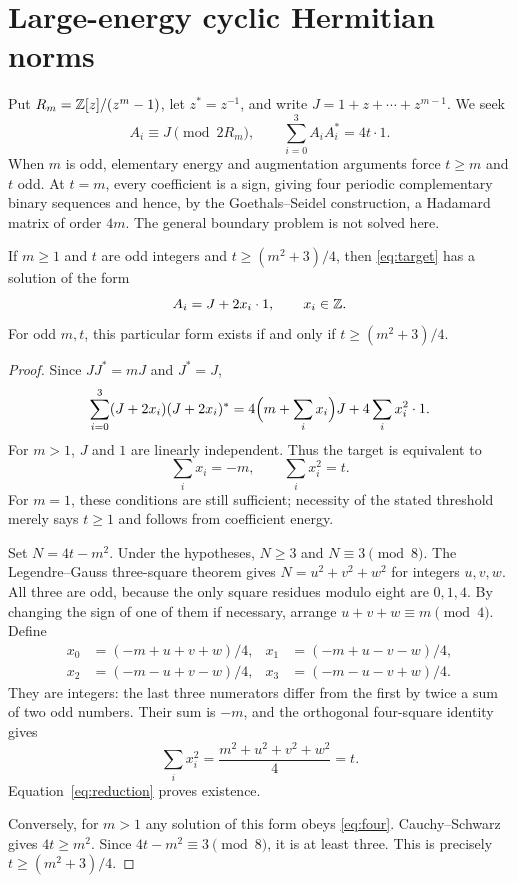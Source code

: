 \section{Large-energy cyclic Hermitian norms}




Put $R_m=\mathbb Z[z]/(z^m-1)$, let $z^*=z^{-1}$, and write
$J=1+z+\cdots+z^{m-1}$. We seek
\begin{equation}\label{eq:target}
 A_i\equiv J\pmod{2R_m},\qquad
 \sum_{i=0}^3A_iA_i^*=4t\cdot1.
\end{equation}
When $m$ is odd, elementary energy and augmentation arguments force
$t\ge m$ and $t$ odd. At $t=m$, every coefficient is a sign, giving
four periodic complementary binary sequences and hence, by the
Goethals--Seidel construction, a Hadamard matrix of order $4m$.
The general boundary problem is not solved here.

\begin{theorem}\label{thm:main}
If $m\ge1$ and $t$ are odd integers and $t\ge(m^2+3)/4$, then
\eqref{eq:target} has a solution of the form
\[
 A_i=J+2x_i\cdot1,\qquad x_i\in\mathbb Z.
\]
For odd $m,t$, this particular form exists if and only if
$t\ge(m^2+3)/4$.
\end{theorem}
\begin{proof}
Since $JJ^*=mJ$ and $J^*=J$,
\begin{equation}\label{eq:reduction}
 \sum_{i=0}^3(J+2x_i)(J+2x_i)^*
 =4\Bigl(m+\sum_i x_i\Bigr)J+4\sum_i x_i^2\cdot1.
\end{equation}
For $m>1$, $J$ and $1$ are linearly independent. Thus the target is
equivalent to
\begin{equation}\label{eq:four}
 \sum_i x_i=-m,\qquad \sum_i x_i^2=t.
\end{equation}
For $m=1$, these conditions are still sufficient; necessity of the
stated threshold merely says $t\ge1$ and follows from coefficient energy.

Set $N=4t-m^2$. Under the hypotheses, $N\ge3$ and $N\equiv3\pmod8$.
The Legendre--Gauss three-square theorem gives
$N=u^2+v^2+w^2$ for integers $u,v,w$. All three are odd, because the
only square residues modulo eight are $0,1,4$. By changing the sign of
one of them if necessary, arrange
$u+v+w\equiv m\pmod4$. Define
\begin{align*}
 x_0&=(-m+u+v+w)/4,& x_1&=(-m+u-v-w)/4,\\
 x_2&=(-m-u+v-w)/4,& x_3&=(-m-u-v+w)/4.
\end{align*}
They are integers: the last three numerators differ from the first by
twice a sum of two odd numbers. Their sum is $-m$, and the orthogonal
four-square identity gives
\[
 \sum_i x_i^2=\frac{m^2+u^2+v^2+w^2}{4}=t.
\]
Equation~\eqref{eq:reduction} proves existence.

Conversely, for $m>1$ any solution of this form obeys
\eqref{eq:four}. Cauchy--Schwarz gives $4t\ge m^2$. Since
$4t-m^2\equiv3\pmod8$, it is at least three. This is precisely
$t\ge(m^2+3)/4$.
\end{proof}

